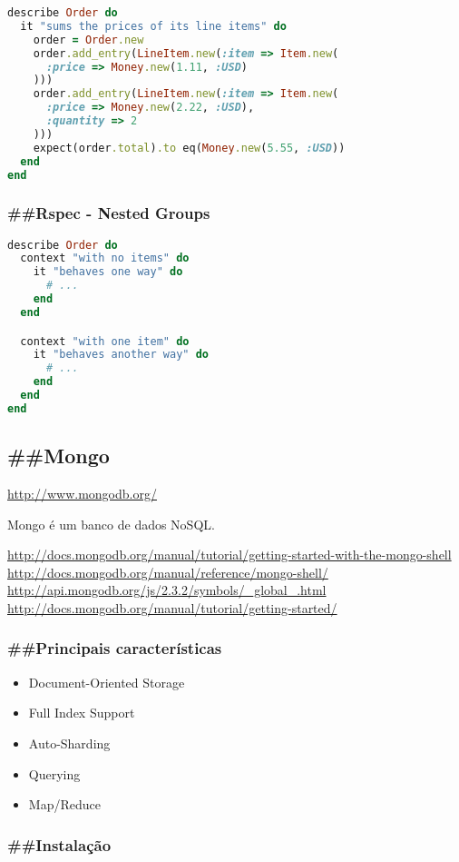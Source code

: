 \documentclass[serif,mathserif]{article}
\begin{document}
\begin{lstlisting}[language=ruby]
describe Order do
  it "sums the prices of its line items" do
    order = Order.new
    order.add_entry(LineItem.new(:item => Item.new(
      :price => Money.new(1.11, :USD)
    )))
    order.add_entry(LineItem.new(:item => Item.new(
      :price => Money.new(2.22, :USD),
      :quantity => 2
    )))
    expect(order.total).to eq(Money.new(5.55, :USD))
  end
end
\end{lstlisting}

\subsubsection{\#\#Rspec - Nested Groups}
\begin{lstlisting}[language=ruby]
 describe Order do
  context "with no items" do
    it "behaves one way" do
      # ...
    end
  end

  context "with one item" do
    it "behaves another way" do
      # ...
    end
  end
end
\end{lstlisting}

 
\subsection{\#\#Mongo}

\url{http://www.mongodb.org/}

Mongo é um banco de dados NoSQL.

\url{http://docs.mongodb.org/manual/tutorial/getting-started-with-the-mongo-shell}
\url{http://docs.mongodb.org/manual/reference/mongo-shell/}
\url{http://api.mongodb.org/js/2.3.2/symbols/_global_.html}
\url{http://docs.mongodb.org/manual/tutorial/getting-started/}


\subsubsection{\#\#Principais características}
\begin{itemize}
  \item Document-Oriented Storage
  \item Full Index Support
  \item Auto-Sharding
  \item Querying
  \item Map/Reduce
\end{itemize}

\subsubsection{\#\#Instalação}
\end{document}
